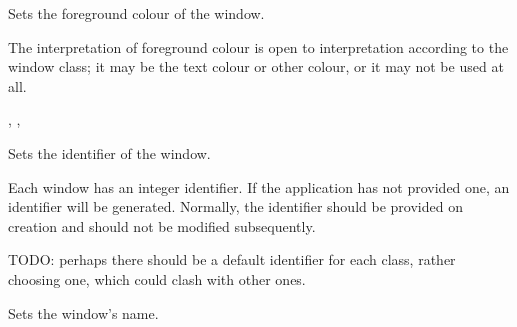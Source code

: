 
Sets the foreground colour of the window.




The interpretation of foreground colour is open to interpretation according
to the window class; it may be the text colour or other colour, or it may not
be used at all.


,\rtfsp
{},\rtfsp
{}

\label{wxwindowsetid}


Sets the identifier of the window.


Each window has an integer identifier. If the application has not provided one,
an identifier will be generated. Normally, the identifier should be provided
on creation and should not be modified subsequently.

TODO: perhaps there should be a default identifier for each class, rather
choosing one, which could clash with other ones.




\label{wxwindowsetname}


Sets the window's name.





\label{wxwindowsetreturncode}


